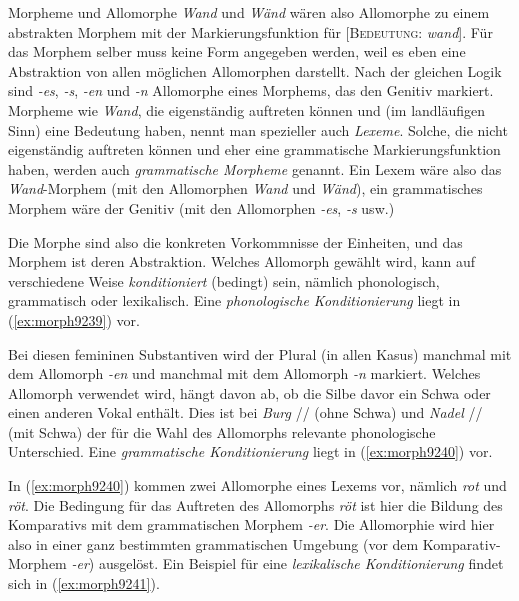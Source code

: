 \begin{Vertiefung}{Morpheme und Allomorphe}
\textit{Wand} und \textit{Wänd} wären also Allomorphe zu einem abstrakten Morphem mit der Markierungsfunktion für [\textsc{Bedeutung}: \textit{wand}].
Für das Morphem selber muss keine Form angegeben werden, weil es eben eine Abstraktion von allen möglichen Allomorphen darstellt.
Nach der gleichen Logik sind \textit{-es}, \textit{-s}, \textit{-en} und \textit{-n} Allomorphe eines Morphems, das den Genitiv markiert.
Morpheme wie \textit{Wand}, die eigenständig auftreten können und (im landläufigen Sinn) eine Bedeutung haben, nennt man spezieller auch \textit{Lexeme}.
Solche, die nicht eigenständig auftreten können und eher eine grammatische Markierungsfunktion haben, werden auch \textit{grammatische Morpheme} genannt.
Ein Lexem wäre also das \textit{Wand}-Morphem (mit den Allomorphen \textit{Wand} und \textit{Wänd}), ein grammatisches Morphem wäre der Genitiv (mit den Allomorphen \textit{-es}, \textit{-s} usw.)

Die Morphe sind also die konkreten Vorkommnisse der Einheiten, und das Morphem ist deren Abstraktion.
Welches Allomorph gewählt wird, kann auf verschiedene Weise \textit{konditioniert} (bedingt) sein, nämlich phonologisch, grammatisch oder lexikalisch.
Eine \textit{phonologische Konditionierung} liegt in (\ref{ex:morph9239}) vor.

\begin{exe}
  \ex{\label{ex:morph9239}}
  \begin{xlist}
  \end{xlist}
\end{exe}

Bei diesen femininen Substantiven wird der Plural (in allen Kasus) manchmal mit dem Allomorph \textit{-en} und manchmal mit dem Allomorph \textit{-n} markiert.
Welches Allomorph verwendet wird, hängt davon ab, ob die Silbe davor ein Schwa oder einen anderen Vokal enthält.
Dies ist bei \textit{Burg} // (ohne Schwa) und \textit{Nadel} // (mit Schwa) der für die Wahl des Allomorphs relevante phonologische Unterschied.
Eine \textit{grammatische Konditionierung} liegt in (\ref{ex:morph9240}) vor.

\begin{exe}
  \ex \label{ex:morph9240}
  \begin{xlist}
  \end{xlist}
\end{exe}

In (\ref{ex:morph9240}) kommen zwei Allomorphe eines Lexems vor, nämlich \textit{rot} und \textit{röt}.
Die Bedingung für das Auftreten des Allomorphs \textit{röt} ist hier die Bildung des Komparativs mit dem grammatischen Morphem \textit{-er}.
Die Allomorphie wird hier also in einer ganz bestimmten grammatischen Umgebung (vor dem Komparativ-Morphem \textit{-er}) ausgelöst.
Ein Beispiel für eine \textit{lexikalische Konditionierung} findet sich in (\ref{ex:morph9241}).


\end{Vertiefung}
